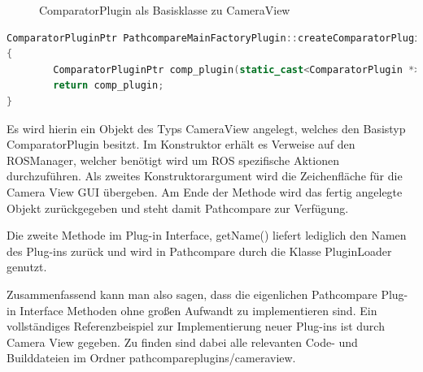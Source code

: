  \begin{figure}[t]
   \begin{center}
   \end{center}
   \caption{ComparatorPlugin als Basisklasse zu CameraView}
   \label{fig:cameraviewcomparator}
 \end{figure}

\begin{lstlisting}[caption=ROS transformation message, language=C++, basicstyle=\footnotesize, label=lst:create]
ComparatorPluginPtr PathcompareMainFactoryPlugin::createComparatorPlugin(ROSManager * ros_manager, QWidget *tab_widget) const
{
        ComparatorPluginPtr comp_plugin(static_cast<ComparatorPlugin *>(new CameraView(ros_manager, tab_widget)));
        return comp_plugin;
}
\end{lstlisting}

Es wird hierin ein Objekt des Typs CameraView angelegt, welches den Basistyp
ComparatorPlugin besitzt. Im Konstruktor erhält es Verweise auf den ROSManager,
welcher benötigt wird um ROS spezifische Aktionen durchzuführen. Als zweites
Konstruktorargument wird die Zeichenfläche für die Camera View GUI übergeben.
Am Ende der Methode wird das fertig angelegte Objekt zurückgegeben und steht
damit Pathcompare zur Verfügung. 

Die zweite Methode im Plug-in Interface, getName() liefert lediglich den Namen
des Plug-ins zurück und wird in Pathcompare durch die Klasse PluginLoader
genutzt.

Zusammenfassend kann man also sagen, dass die eigenlichen Pathcompare Plug-in Interface
Methoden ohne großen Aufwandt zu implementieren sind. Ein vollständiges
Referenzbeispiel zur Implementierung neuer Plug-ins ist durch Camera View gegeben.
Zu finden sind dabei alle relevanten Code- und Builddateien im Ordner
pathcompareplugins/cameraview.


